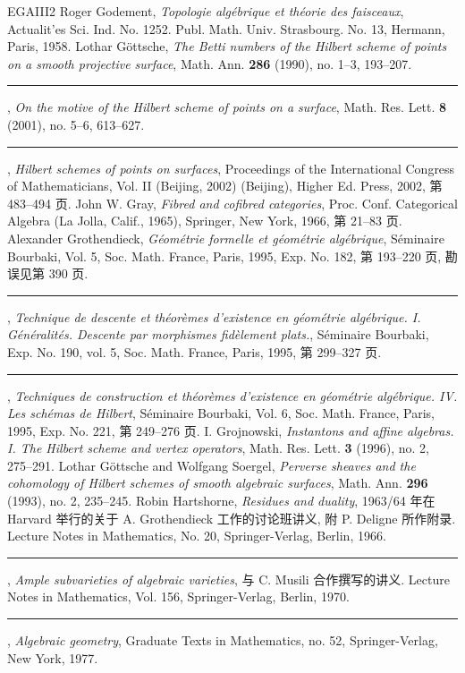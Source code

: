 \begin{thebibliography}{EGAIII2}
 Roger Godement, \emph{Topologie algébrique et théorie des faisceaux}, Actualit'es Sci. Ind. No. 1252. Publ. Math. Univ. Strasbourg. No. 13, Hermann, Paris, 1958.
 Lothar Göttsche, \emph{The Betti numbers of the Hilbert scheme of points on a smooth projective surface}, Math. Ann. \textbf{286} (1990), no. 1--3, 193--207.
 \rule{2em}{.3pt}, \emph{On the motive of the Hilbert scheme of points on a surface}, Math. Res. Lett. \textbf{8} (2001), no. 5--6, 613--627.
 \rule{2em}{.3pt}, \emph{Hilbert schemes of points on surfaces}, Proceedings of the International Congress of Mathematicians, Vol. II (Beijing, 2002) (Beijing), Higher Ed. Press, 2002, 第 483--494 页.
 John W. Gray, \emph{Fibred and cofibred categories}, Proc. Conf. Categorical Algebra (La Jolla, Calif., 1965), Springer, New York, 1966, 第 21--83 页.
 Alexander Grothendieck, \emph{Géométrie formelle et géométrie algébrique}, Séminaire Bourbaki, Vol. 5, Soc. Math. France, Paris, 1995, Exp. No. 182, 第 193--220 页, 勘误见第 390 页.
 \rule{2em}{.3pt}, \emph{Technique de descente et théorèmes d'existence en géométrie algébrique. I. Généralités. Descente par morphismes fidèlement plats.}, Séminaire Bourbaki, Exp. No. 190, vol. 5, Soc. Math. France, Paris, 1995, 第 299--327 页.
 \rule{2em}{.3pt}, \emph{Techniques de construction et théorèmes d'existence en géométrie algébrique. IV. Les schémas de Hilbert}, Séminaire Bourbaki, Vol. 6, Soc. Math. France, Paris, 1995, Exp. No. 221, 第 249--276 页.
 I. Grojnowski, \emph{Instantons and affine algebras. I. The Hilbert scheme and vertex operators}, Math. Res. Lett. \textbf{3} (1996), no. 2, 275--291.
 Lothar Göttsche and Wolfgang Soergel, \emph{Perverse sheaves and the cohomology of Hilbert schemes of smooth algebraic surfaces}, Math. Ann. \textbf{296} (1993), no. 2, 235--245.
 Robin Hartshorne, \emph{Residues and duality}, 1963/64 年在 Harvard 举行的关于 A. Grothendieck 工作的讨论班讲义, 附 P. Deligne 所作附录. Lecture Notes in Mathematics, No. 20, Springer-Verlag, Berlin, 1966.
 \rule{2em}{.3pt}, \emph{Ample subvarieties of algebraic varieties}, 与 C. Musili 合作撰写的讲义. Lecture Notes in Mathematics, Vol. 156, Springer-Verlag, Berlin, 1970.
 \rule{2em}{.3pt}, \emph{Algebraic geometry}, Graduate Texts in Mathematics, no. 52, Springer-Verlag, New York, 1977.

\end{thebibliography}
